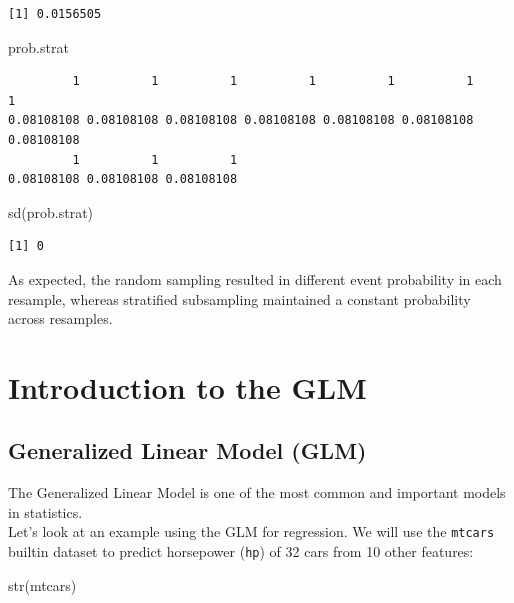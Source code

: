 \documentclass[
]{book}
\newenvironment{Shaded}{\begin{snugshade}}{\end{snugshade}}
\newcommand{\FunctionTok}[1]{\textcolor[rgb]{0.00,0.00,0.00}{#1}}
\newcommand{\NormalTok}[1]{#1}
\begin{document}
\begin{verbatim}
[1] 0.0156505
\end{verbatim}

\begin{Shaded}
\begin{Highlighting}[]
\NormalTok{prob.strat}
\end{Highlighting}
\end{Shaded}

\begin{verbatim}
         1          1          1          1          1          1          1 
0.08108108 0.08108108 0.08108108 0.08108108 0.08108108 0.08108108 0.08108108 
         1          1          1 
0.08108108 0.08108108 0.08108108 
\end{verbatim}

\begin{Shaded}
\begin{Highlighting}[]
\FunctionTok{sd}\NormalTok{(prob.strat)}
\end{Highlighting}
\end{Shaded}

\begin{verbatim}
[1] 0
\end{verbatim}

As expected, the random sampling resulted in different event probability in each resample, whereas stratified subsampling maintained a constant probability across resamples.

\hypertarget{glm}{%
\chapter{Introduction to the GLM}\label{glm}}

\hypertarget{generalized-linear-model-glm}{%
\section{Generalized Linear Model (GLM)}\label{generalized-linear-model-glm}}

The Generalized Linear Model is one of the most common and important models in statistics.\\
Let's look at an example using the GLM for regression. We will use the \texttt{mtcars} builtin dataset to predict horsepower (\texttt{hp}) of 32 cars from 10 other features:

\begin{Shaded}
\begin{Highlighting}[]
\FunctionTok{str}\NormalTok{(mtcars)}
\end{Highlighting}
\end{Shaded}
\end{document}

